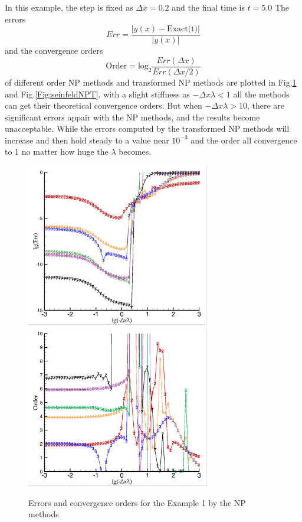 \documentclass[review]{elsarticle}
\theoremstyle{plain}\newtheorem{definition}{\sc{Definition}}
\theoremstyle{defination}\newtheorem{example}{Example}[section]
\numberwithin{equation}{section}
\numberwithin{table}{section}
\begin{document}
{	In this example, the step is fixed as $\Delta x =0.2$ and the final time is $t=5.0$	 The errors
	\begin{equation}
	  Err= \frac{|y(x)- \text{Exact(t)}|}{|y(x)|} 
  \end{equation}
 and the convergence orders 
 \begin{equation} 
   \text{Order}=\text{log}_2\frac{Err(\Delta x)}{Err(\Delta x/2)}
 \end{equation}
 of different order NP methods and transformed NP methods are plotted in Fig.\ref{Fig:seinfeldNP} and Fig.\ref{Fig:seinfeldNPT}.  with a slight stiffness as $-\Delta x \lambda < 1$ all the methods can get their theoretical convergence orders. But when $-\Delta x \lambda >10$, there are significant errors appair with the NP methods, and the results become unacceptable. While the errors computed by the transformed NP methods will increase and then hold steady to a value near $ 10^{-3}$ and the order all convergence to 1 no matter how huge the $\lambda$ becomes.             

\begin{figure}
  \centering
  \includegraphics[width=8cm]{NP_Err.png}
  \includegraphics[width=8cm]{NP_order.png}
	\caption{Errors and convergence orders for the Example 1 by  the  NP methods }
	\label{Fig:seinfeldNP}
  \end{figure}

}
\end{document}

